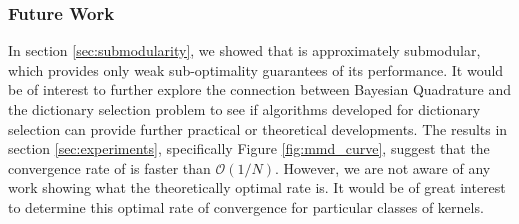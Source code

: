 \subsubsection{Future Work}

In section \ref{sec:submodularity}, we showed that \sbq{} is approximately submodular, which provides only weak sub-optimality guarantees of its performance. It would be of interest to further explore the connection between Bayesian Quadrature and the dictionary selection problem to see if algorithms developed for dictionary selection can provide further practical or theoretical developments. The results in section \ref{sec:experiments}, specifically Figure \ref{fig:mmd_curve}, suggest that the convergence rate of \sbq{} is faster than $\mathcal{O}(1/N)$. However, we are not aware of any work showing what the theoretically optimal rate is. It would be of great interest to determine this optimal rate of convergence for particular classes of kernels.


